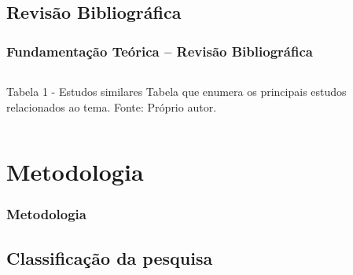 \documentclass[aspectratio=169]{beamer}
\begin{document}
\subsection{Revisão Bibliográfica}
\begin{frame}[fragile] 
    \frametitle{Fundamentação Teórica -- Revisão Bibliográfica}
    \begin{columns}[c]
		\begin{column}{1\linewidth}
			\begin{figure}
				\label{fig:estudos}
			\end{figure}

			\begin{block}{Tabela 1 - Estudos similares}
				Tabela que enumera os principais estudos relacionados ao tema. \newline Fonte: Próprio autor.    
			\end{block}
		\end{column}
	\end{columns}
\end{frame}


\section{Metodologia}

\begin{frame} \frametitle{Metodologia}
\end{frame}


\subsection{Classificação da pesquisa}
\end{document}
